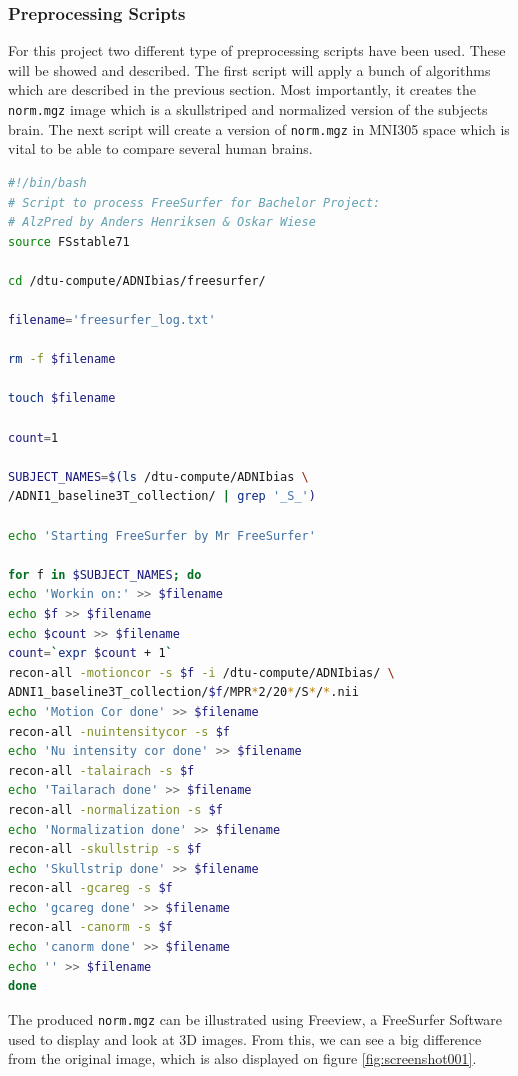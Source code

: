 \documentclass[12pt, fleqn, titlepage]{article}
\begin{document}
\subsubsection{Preprocessing Scripts}

For this project two different type of preprocessing scripts have been used. These will be showed and described. The first script will apply a bunch of algorithms which are described in the previous section. Most importantly, it creates the \texttt{norm.mgz} image which is a skullstriped and normalized version of the subjects brain. The next script will create a version of \texttt{norm.mgz} in MNI305 space which is vital to be able to compare several human brains.

\begin{lstlisting}[language=bash,caption={FreeSurfer Preprocessing}]
#!/bin/bash 
# Script to process FreeSurfer for Bachelor Project:
# AlzPred by Anders Henriksen & Oskar Wiese
source FSstable71

cd /dtu-compute/ADNIbias/freesurfer/

filename='freesurfer_log.txt'

rm -f $filename

touch $filename

count=1

SUBJECT_NAMES=$(ls /dtu-compute/ADNIbias \ 
/ADNI1_baseline3T_collection/ | grep '_S_')

echo 'Starting FreeSurfer by Mr FreeSurfer' 

for f in $SUBJECT_NAMES; do
echo 'Workin on:' >> $filename
echo $f >> $filename
echo $count >> $filename 
count=`expr $count + 1`
recon-all -motioncor -s $f -i /dtu-compute/ADNIbias/ \
ADNI1_baseline3T_collection/$f/MPR*2/20*/S*/*.nii 
echo 'Motion Cor done' >> $filename
recon-all -nuintensitycor -s $f  
echo 'Nu intensity cor done' >> $filename
recon-all -talairach -s $f 
echo 'Tailarach done' >> $filename
recon-all -normalization -s $f 
echo 'Normalization done' >> $filename
recon-all -skullstrip -s $f     
echo 'Skullstrip done' >> $filename
recon-all -gcareg -s $f  
echo 'gcareg done' >> $filename
recon-all -canorm -s $f  
echo 'canorm done' >> $filename
echo '' >> $filename
done 
\end{lstlisting}

\noindent
The produced \texttt{norm.mgz} can be illustrated using Freeview, a FreeSurfer Software used to display and look at 3D images. From this, we can see a big difference from the original image, which is also displayed on figure \ref{fig:screenshot001}.
\end{document}
